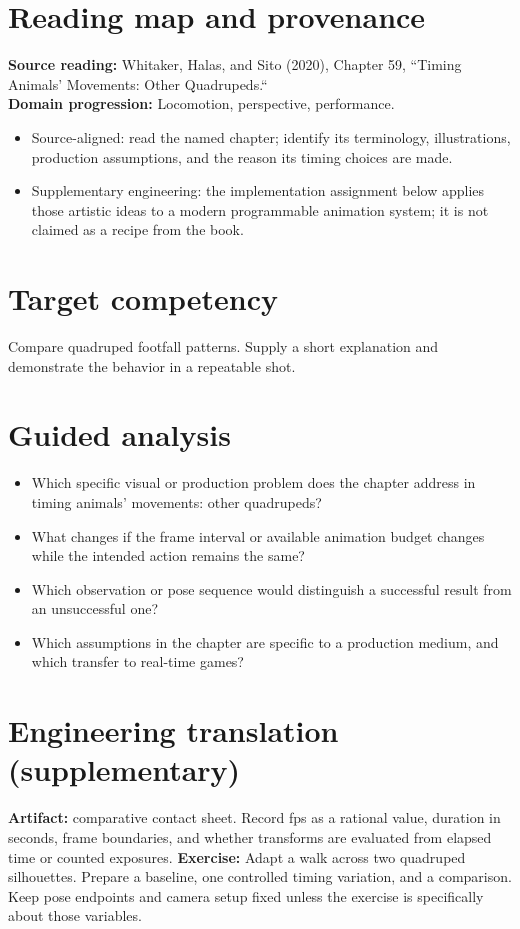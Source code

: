 \documentclass[10pt,letterpaper]{article}
\begin{document}
\makedoctitle
\makedocsummary

\section{Reading map and provenance}
\textbf{Source reading:} Whitaker, Halas, and Sito (2020), Chapter 59, ``Timing Animals’ Movements: Other Quadrupeds.``\\
\textbf{Domain progression:} Locomotion, perspective, performance.
\begin{itemize}
\item Source-aligned: read the named chapter; identify its terminology, illustrations, production assumptions, and the reason its timing choices are made.
\item Supplementary engineering: the implementation assignment below applies those artistic ideas to a modern programmable animation system; it is not claimed as a recipe from the book.
\end{itemize}
\section{Target competency}
Compare quadruped footfall patterns. Supply a short explanation and demonstrate the behavior in a repeatable shot.
\section{Guided analysis}
\begin{itemize}
\item Which specific visual or production problem does the chapter address in timing animals’ movements: other quadrupeds?
\item What changes if the frame interval or available animation budget changes while the intended action remains the same?
\item Which observation or pose sequence would distinguish a successful result from an unsuccessful one?
\item Which assumptions in the chapter are specific to a production medium, and which transfer to real-time games?
\end{itemize}
\section{Engineering translation (supplementary)}
\textbf{Artifact:} comparative contact sheet. Record fps as a rational value, duration in seconds, frame boundaries, and whether transforms are evaluated from elapsed time or counted exposures.
\textbf{Exercise:} Adapt a walk across two quadruped silhouettes. Prepare a baseline, one controlled timing variation, and a comparison. Keep pose endpoints and camera setup fixed unless the exercise is specifically about those variables.
\end{document}
